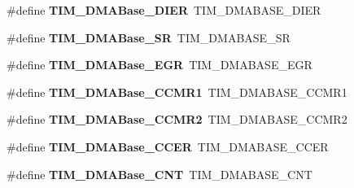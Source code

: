 \begin{DoxyCompactItemize}
\item 
\hypertarget{group___h_a_l___t_i_m___aliased___defines_gaeddacbbc2adf9705feac250f077d8c93}{\#define {\bfseries T\-I\-M\-\_\-\-D\-M\-A\-Base\-\_\-\-D\-I\-E\-R}~T\-I\-M\-\_\-\-D\-M\-A\-B\-A\-S\-E\-\_\-\-D\-I\-E\-R}\label{group___h_a_l___t_i_m___aliased___defines_gaeddacbbc2adf9705feac250f077d8c93}

\item 
\hypertarget{group___h_a_l___t_i_m___aliased___defines_ga5cda07a11a76bbb24a7d5bb680814d31}{\#define {\bfseries T\-I\-M\-\_\-\-D\-M\-A\-Base\-\_\-\-S\-R}~T\-I\-M\-\_\-\-D\-M\-A\-B\-A\-S\-E\-\_\-\-S\-R}\label{group___h_a_l___t_i_m___aliased___defines_ga5cda07a11a76bbb24a7d5bb680814d31}

\item 
\hypertarget{group___h_a_l___t_i_m___aliased___defines_gab5e6f6c3fea100896d13ce317a6ccd8e}{\#define {\bfseries T\-I\-M\-\_\-\-D\-M\-A\-Base\-\_\-\-E\-G\-R}~T\-I\-M\-\_\-\-D\-M\-A\-B\-A\-S\-E\-\_\-\-E\-G\-R}\label{group___h_a_l___t_i_m___aliased___defines_gab5e6f6c3fea100896d13ce317a6ccd8e}

\item 
\hypertarget{group___h_a_l___t_i_m___aliased___defines_gaab384496cff3e54d8179fc0db727c7ee}{\#define {\bfseries T\-I\-M\-\_\-\-D\-M\-A\-Base\-\_\-\-C\-C\-M\-R1}~T\-I\-M\-\_\-\-D\-M\-A\-B\-A\-S\-E\-\_\-\-C\-C\-M\-R1}\label{group___h_a_l___t_i_m___aliased___defines_gaab384496cff3e54d8179fc0db727c7ee}

\item 
\hypertarget{group___h_a_l___t_i_m___aliased___defines_ga4989f74592ab359f30bd7c4a4a457571}{\#define {\bfseries T\-I\-M\-\_\-\-D\-M\-A\-Base\-\_\-\-C\-C\-M\-R2}~T\-I\-M\-\_\-\-D\-M\-A\-B\-A\-S\-E\-\_\-\-C\-C\-M\-R2}\label{group___h_a_l___t_i_m___aliased___defines_ga4989f74592ab359f30bd7c4a4a457571}

\item 
\hypertarget{group___h_a_l___t_i_m___aliased___defines_ga6935639db5738662520e8d0eb7116dd6}{\#define {\bfseries T\-I\-M\-\_\-\-D\-M\-A\-Base\-\_\-\-C\-C\-E\-R}~T\-I\-M\-\_\-\-D\-M\-A\-B\-A\-S\-E\-\_\-\-C\-C\-E\-R}\label{group___h_a_l___t_i_m___aliased___defines_ga6935639db5738662520e8d0eb7116dd6}

\item 
\hypertarget{group___h_a_l___t_i_m___aliased___defines_gacab604257d144cf3a59b360cbc958ec9}{\#define {\bfseries T\-I\-M\-\_\-\-D\-M\-A\-Base\-\_\-\-C\-N\-T}~T\-I\-M\-\_\-\-D\-M\-A\-B\-A\-S\-E\-\_\-\-C\-N\-T}\label{group___h_a_l___t_i_m___aliased___defines_gacab604257d144cf3a59b360cbc958ec9}


\end{DoxyCompactItemize}
